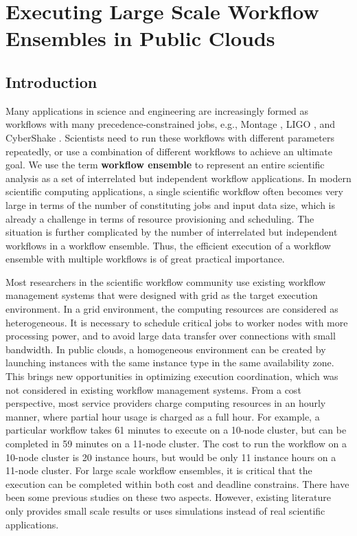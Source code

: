 \chapter{Executing Large Scale Workflow Ensembles in Public Clouds}
\label{chapter:dewe_v2}

\section{Introduction}
\label{sec:intro}

Many applications in science and engineering are increasingly formed as workflows with many precedence-constrained jobs, e.g., Montage \cite{montage, web:montage}, LIGO \cite{ligo}, and CyberShake \cite{cybershake}. Scientists need to run these workflows with different parameters repeatedly, or use a combination of different workflows to achieve an ultimate goal. We use the term \textbf{workflow ensemble} to represent an entire scientific analysis as a set of interrelated but independent workflow applications. In modern scientific computing applications, a single scientific workflow often becomes very large in terms of the number of constituting jobs and input data size, which is already a challenge in terms of resource provisioning and scheduling. The situation is further complicated by the number of interrelated but independent workflows in a workflow ensemble. Thus, the efficient execution of a workflow ensemble with multiple workflows is of great practical importance.

Most researchers in the scientific workflow community use existing workflow management systems that were designed with grid as the target execution environment. In a grid environment, the computing resources are considered as heterogeneous. It is necessary to schedule critical jobs to worker nodes with more processing power, and to avoid large data transfer over connections with small bandwidth. In public clouds, a homogeneous environment can be created by launching instances with the same instance type in the same availability zone. This brings new opportunities in optimizing execution coordination, which was not considered in existing workflow management systems. From a cost perspective, most service providers charge computing resources in an hourly manner, where partial hour usage is charged as a full hour. For example, a particular workflow takes 61 minutes to execute on a 10-node cluster, but can be completed in 59 minutes on a 11-node cluster. The cost to run the workflow on a 10-node cluster is 20 instance hours, but would be only 11 instance hours on a 11-node cluster. For large scale workflow ensembles, it is critical that the execution can be completed within both cost and deadline constrains. There have been some previous studies on these two aspects. However, existing literature only provides small scale results or uses simulations instead of real scientific applications.

